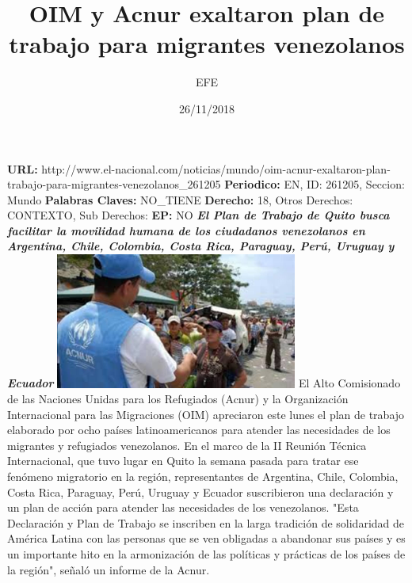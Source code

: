 \documentclass{article}%
\title{\textbf{OIM y Acnur exaltaron plan de trabajo para migrantes venezolanos}}%
\author{EFE}%
\date{26/11/2018}%
\begin{document}
%
\normalsize%
\maketitle%
\textbf{URL: }%
http://www.el{-}nacional.com/noticias/mundo/oim{-}acnur{-}exaltaron{-}plan{-}trabajo{-}para{-}migrantes{-}venezolanos\_261205\newline%
%
\textbf{Periodico: }%
EN, %
ID: %
261205, %
Seccion: %
Mundo\newline%
%
\textbf{Palabras Claves: }%
NO\_TIENE\newline%
%
\textbf{Derecho: }%
18, %
Otros Derechos: %
CONTEXTO, %
Sub Derechos: %
\newline%
%
\textbf{EP: }%
NO\newline%
\newline%
%
\textbf{\textit{El Plan de Trabajo de Quito busca facilitar la movilidad humana de los ciudadanos venezolanos en Argentina, Chile, Colombia, Costa Rica, Paraguay, Perú, Uruguay y Ecuador}}%
\newline%
\newline%
%
\includegraphics[width=300px]{99.jpg}%
\newline%
%
El Alto Comisionado de las Naciones Unidas para los Refugiados (Acnur) y la Organización Internacional para las Migraciones (OIM) apreciaron este lunes el plan de trabajo elaborado por ocho países latinoamericanos para atender las necesidades de los migrantes y refugiados venezolanos.%
\newline%
%
En el marco de la II Reunión Técnica Internacional, que tuvo lugar en Quito la semana pasada para tratar ese fenómeno migratorio en la región, representantes de Argentina, Chile, Colombia, Costa Rica, Paraguay, Perú, Uruguay y Ecuador suscribieron una declaración y un plan de acción para atender las necesidades de los venezolanos.%
\newline%
%
"Esta Declaración y Plan de Trabajo se inscriben en la larga tradición de solidaridad de América Latina con las personas que se ven obligadas a abandonar sus países y es un importante hito en la armonización de las políticas y prácticas de los países de la región", señaló un informe de la Acnur.%
\end{document}
